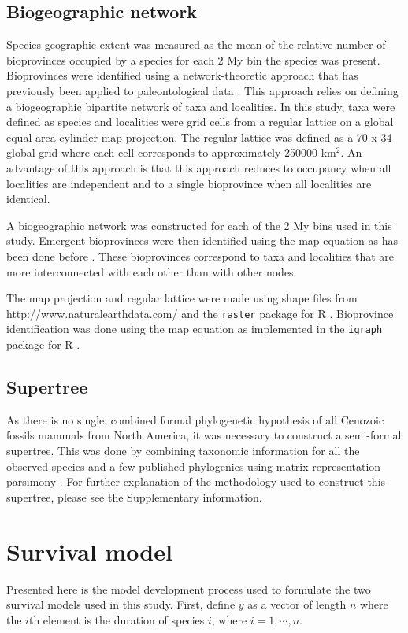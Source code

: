 \documentclass{pnastwo}
\begin{document}
\begin{article}
\begin{materials}
\subsection{Biogeographic network}
Species geographic extent was measured as the mean of the relative number of bioprovinces occupied by a species for each 2 My bin the species was present. Bioprovinces were identified using a network-theoretic approach that has previously been applied to paleontological data \cite{Sidor2013,Vilhena2013}. This approach relies on defining a biogeographic bipartite network of taxa and localities. In this study, taxa were defined as species and localities were grid cells from a regular lattice on a global equal-area cylinder map projection. The regular lattice was defined as a 70 x 34 global grid where each cell corresponds to approximately 250000 km\(^{2}\). An advantage of this approach is that this approach reduces to occupancy when all localities are independent and to a single bioprovince when all localities are identical.

A biogeographic network was constructed for each of the 2 My bins used in this study. Emergent bioprovinces were then identified using the map equation \cite{Rosvall2008,Rosvall2009a} as has been done before \cite{Sidor2013,Vilhena2013b,Vilhena2013}. These bioprovinces correspond to taxa and localities that are more interconnected with each other than with other nodes.

The map projection and regular lattice were made using shape files from http://www.naturalearthdata.com/ and the \texttt{raster} package for R \cite{raster}. Bioprovince identification was done using the map equation as implemented in the \texttt{igraph} package for R \cite{csardi2006igraph}.


\subsection{Supertree}
As there is no single, combined formal phylogenetic hypothesis of all Cenozoic fossils mammals from North America, it was necessary to construct a semi-formal supertree. This was done by combining taxonomic information for all the observed species and a few published phylogenies using matrix representation parsimony \cite{Bininda-Emonds2007}. For further explanation of the methodology used to construct this supertree, please see the Supplementary information.


\section{Survival model}
Presented here is the model development process used to formulate the two survival models used in this study. First, define \(y\) as a vector of length \(n\) where the \(i\)th element is the duration of species \(i\), where \(i = 1,\cdots,n\).


\end{materials}
\end{article}
\end{document}
